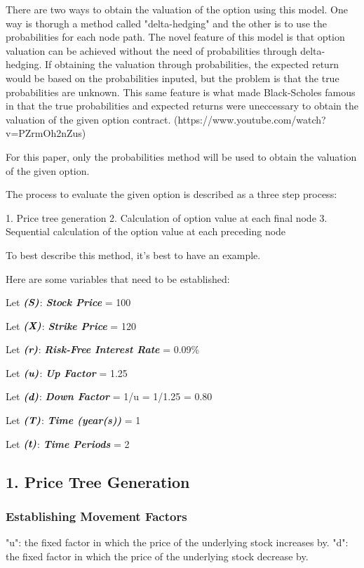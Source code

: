 \documentclass[12pt, letterpaper]{article}
\begin{document}
There are two ways to obtain the valuation of the option using this model.
One way is thorugh a method called "delta-hedging" and the other is to use the probabilities for each node path.
The novel feature of this model is that option valuation can be achieved without the need of probabilities through delta-hedging.
If obtaining the valuation through probabilities, the expected return would be based on the probabilities inputed, but the problem is that the true probabilities are unknown.
This same feature is what made Black-Scholes famous in that the true probabilities and expected returns were uneccessary to obtain the valuation of the given option contract. (https://www.youtube.com/watch?v=PZrmOh2nZus)

For this paper, only the probabilities method will be used to obtain the valuation of the given option. 

The process to evaluate the given option is described as a three step process: %

1. Price tree generation
2. Calculation of option value at each final node
3. Sequential calculation of the option value at each preceding node

To best describe this method, it's best to have an example.

Here are some variables that need to be established:

Let ${\textit{\textbf{(S)}}}$: \textit{\textbf{Stock Price}} = 100

Let ${\textit{\textbf{(X)}}}$: \textit{\textbf{Strike Price}} = 120

Let ${\textit{\textbf{(r)}}}$: \textit{\textbf{Risk-Free Interest Rate}} = 0.09\%

Let ${\textit{\textbf{(u)}}}$: \textit{\textbf{Up Factor}} = 1.25

Let ${\textit{\textbf{(d)}}}$: \textit{\textbf{Down Factor}} = 1/u = 1/1.25 = 0.80

Let ${\textit{\textbf{(T)}}}$: \textit{\textbf{Time (year(s))}}  = 1

Let ${\textit{\textbf{(t)}}}$: \textit{\textbf{Time Periods}}  = 2 

\pagebreak
\subsection*{1. Price Tree Generation}
\subsubsection*{Establishing Movement Factors}
"u": the fixed factor in which the price of the underlying stock increases by.
"d": the fixed factor in which the price of the underlying stock decrease by.
\end{document}

